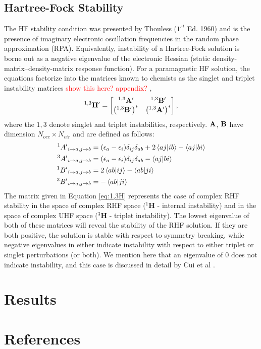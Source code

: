 \documentclass{revtex4}
\begin{document}
    \subsection{Hartree-Fock Stability}
    The HF stability condition was presented by Thouless \cite{Thouless1972} ($1^{st}$ Ed. 1960) and is the presence of imaginary electronic oscillation frequencies in the random phase approximation (RPA). Equivalently, instability of a Hartree-Fock solution is borne out as a negative eigenvalue of the electronic Hessian (static density-matrix--density-matrix response function). For a paramagnetic HF solution, the equations factorize into the matrices known to chemists as the singlet and triplet instability matrices \cite{Dunning1967}\cite{Seeger1977} \textcolor{red}{show this here? appendix?}
    ,
    \begin{equation}\label{eq:1,3H}
    {}^{1,3}\bf{H'}=
    \begin{bmatrix}
    {}^{1,3}\bf{A'} & {}^{1,3}\bf{B'} \\
    \left({}^{1,3}\bf{B'}\right)^* & \left({}^{1,3}\bf{A'}\right)^* \\
    \end{bmatrix},
    \end{equation}
    where the $1,3$ denote singlet and triplet instabilities, respectively. $\bf{A}$, $\bf{B}$ have dimension $N_{occ}\times N_{vir}$ and are defined as follows:
    \begin{subequations}
    	\begin{align}
    	{}^{1}{A'}_{i\rightarrow a, j\rightarrow b} &= (\epsilon_a-\epsilon_i)\delta_{ij}\delta_{ab} + 2\braket{aj|ib}-\braket{aj|bi}\\
    	{}^{3}{A'}_{i\rightarrow a, j\rightarrow b} &= (\epsilon_a-\epsilon_i)\delta_{ij}\delta_{ab} - \braket{aj|bi}\\
    	{}^{1}{B'}_{i\rightarrow a, j\rightarrow b} &= 2\braket{ab|ij}-\braket{ab|ji}\\
    	{}^{3}{B'}_{i\rightarrow a, j\rightarrow b} &= -\braket{ab|ji}
    	\end{align}
    \end{subequations}
    The matrix given in Equation \ref{eq:1,3H} represents the case of complex RHF stability in the 
    space of complex RHF space (${}^{1}\mathbf{H}$ - internal instability) and in the space of 
    complex UHF space (${}^{3}\mathbf{H}$ - triplet instability). The lowest eigenvalue of both of 
    these matrices will reveal the stability of the RHF solution. If they are both positive, the 
    solution is stable with respect to symmetry breaking, while negative eigenvalues in either 
    indicate instability with respect to either triplet or singlet perturbations (or both). We 
    mention here that an eigenvalue of 0 does not indicate instability, and this case is discussed 
    in detail by Cui et al \cite{Cui2013}.
    
    \section{Results}
    
    

\section{References}

\end{document}
